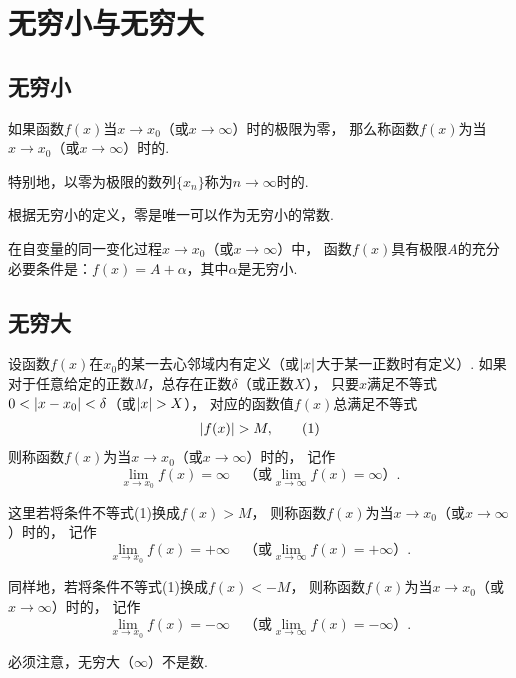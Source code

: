 \section{无穷小与无穷大}
\subsection{无穷小}
\begin{definition}
如果函数\(f(x)\)当\(x \to x_0\)（或\(x \to \infty\)）时的极限为零，
那么称函数\(f(x)\)为当\(x \to x_0\)（或\(x \to \infty\)）时的.

特别地，以零为极限的数列\(\{x_n\}\)称为\(n \to \infty\)时的.
\end{definition}

根据无穷小的定义，零是唯一可以作为无穷小的常数.

\begin{theorem}
在自变量的同一变化过程\(x \to x_0\)（或\(x \to \infty\)）中，
函数\(f(x)\)具有极限\(A\)的充分必要条件是：\(f(x) = A + \alpha\)，其中\(\alpha\)是无穷小.
\end{theorem}

\subsection{无穷大}
\begin{definition}
设函数\(f(x)\)在\(x_0\)的某一去心邻域内有定义（或\(\abs{x}\)大于某一正数时有定义）.
如果对于任意给定的正数\(M\)，总存在正数\(\delta\)（或正数\(X\)），
只要\(x\)满足不等式\(0 < \abs{x - x_0} < \delta\)（或\(\abs{x} > X\)），
对应的函数值\(f(x)\)总满足不等式\begin{gather}
	\abs{f(x)} > M, \tag1
\end{gather}
则称函数\(f(x)\)为当\(x \to x_0\)（或\(x \to \infty\)）时的，
记作\[
	\lim_{x \to x_0}f(x) = \infty
	\quad\text{（或} \lim_{x \to \infty}f(x) = \infty \text{）}.
\]

这里若将条件不等式(1)换成\(f(x) > M\)，
则称函数\(f(x)\)为当\(x \to x_0\)（或\(x \to \infty\)）时的，
记作\[
	\lim_{x \to x_0}f(x) = +\infty
	\quad\text{（或} \lim_{x \to \infty}f(x) = +\infty \text{）}.
\]

同样地，若将条件不等式(1)换成\(f(x) < -M\)，
则称函数\(f(x)\)为当\(x \to x_0\)（或\(x \to \infty\)）时的，
记作\[
	\lim_{x \to x_0}f(x) = -\infty
	\quad\text{（或} \lim_{x \to \infty}f(x) = -\infty \text{）}.
\]
\end{definition}
必须注意，无穷大（\(\infty\)）不是数.

